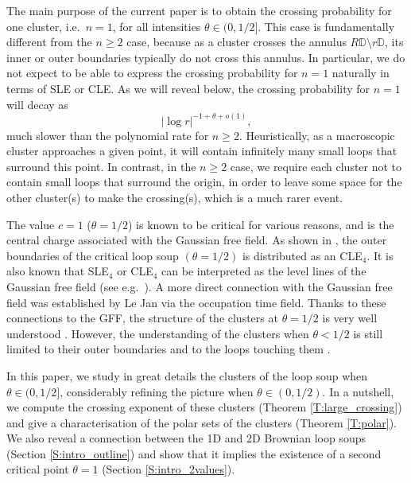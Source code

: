 \documentclass[11pt]{article}
\theoremstyle{remark}
\newcommand{\D}{\mathbb{D}}
\numberwithin{equation}{section}
\begin{document}
The main purpose of the current paper is to obtain the crossing probability for one cluster, i.e.\ $n=1$, for all intensities $\theta\in(0,1/2]$. This case is fundamentally different from the $n\ge 2$ case, because as a cluster crosses the annulus $R\D \setminus r\D$, its inner or outer boundaries typically do not cross this annulus. 
In particular, we do not expect to be able to express the crossing probability for $n=1$ naturally in terms of SLE or CLE. As we will reveal  below, the crossing probability for $n=1$ will decay as
$$|\log r|^{-1+\theta+o(1)},$$
much slower than the polynomial rate for $n\ge 2$. 
Heuristically, as a macroscopic cluster approaches a given point, it will contain infinitely many small loops that surround this point. In contrast, in the $n\ge 2$ case, we require each cluster not to contain small loops that surround the origin, in order to leave some space for the other cluster(s) to make the crossing(s), which is a much rarer event.



The value $c=1$ ($\theta=1/2$) is known to be critical for various reasons, and is the central charge associated with the Gaussian free field. As shown in  \cite{SheffieldWernerCLE}, the outer boundaries of the critical loop soup $(\theta=1/2)$ is distributed as an CLE$_4$. It is also known that SLE$_4$ or CLE$_4$ can be interpreted as the level lines of the Gaussian free field (see e.g.\ \cite{MR2486487,MR3101840,MR2525778,MR3708206,MR3936643}).
A more direct connection with the Gaussian free field was established by Le Jan \cite{LeJan2010LoopsRenorm, LeJan2011Loops} via the occupation time field.
Thanks to these connections to the GFF, the structure of the clusters at $\theta=1/2$ is very well understood 
\cite{LupuIsomorphism, Lupu19ConvCLE, QianWerner19Clusters, ALS1, ALS2}. However, the understanding of the clusters when $\theta < 1/2$ is still limited to their outer boundaries \cite{SheffieldWernerCLE, BCL16} and to the loops touching them \cite{Qian19BLportionboundary,Qian21DisconnectExponent,GaoLiQian2022mutliple}.

In this paper, we study in great details the clusters of the loop soup when $\theta \in (0,1/2]$, considerably refining the picture when $\theta \in (0,1/2)$. 
In a nutshell, we compute the crossing exponent of these clusters (Theorem \ref{T:large_crossing}) and give a characterisation of the polar sets of the clusters (Theorem \ref{T:polar}). We also reveal a connection between the 1D and 2D Brownian loop soups (Section \ref{S:intro_outline}) and show that it implies the existence of a second critical point $\theta =1$ (Section \ref{S:intro_2values}).
\end{document}
